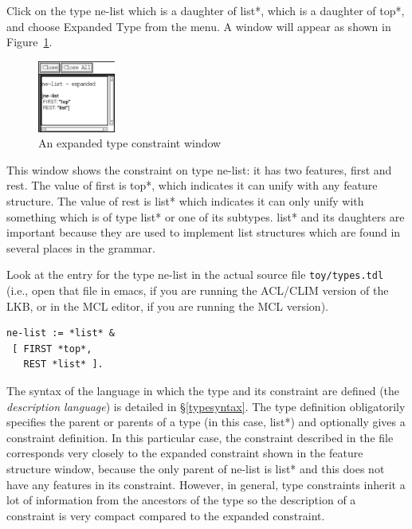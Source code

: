 \documentclass[12pt]{report}
\newcommand{\filename}[1]{{\tt #1}}
\newcommand{\lkbmenucommand}{{\bf}}
\newcommand{\newterm}[1]{{\it #1}}
\begin{document}
Click on the type {\type ne-list}
which is a daughter of {\type *list*}, which is a daughter of {\type *top*},
and choose {\lkbmenucommand Expanded Type} from the menu.  A window will appear
as shown in Figure~\ref{ne-list}.
\begin{figure}
\includegraphics[width=1in]{figs/ne-list}
\caption{An expanded type constraint window}
\label{ne-list}
\end{figure}
This window shows the constraint on type {\type ne-list}: it has
two features, {\feature first} and {\feature rest}.  The value of
{\feature first} is {\type *top*}, which indicates it can unify with any
feature structure.  The value of {\feature rest} is {\type *list*}
which indicates it can only unify with something which is
of type {\type *list*} or one of its subtypes.  {\type *list*} and 
its daughters are important because they are used to implement
list structures which are found in several places in the grammar.

Look at the entry for the type {\type ne-list} in the actual source
file \filename{toy/types.tdl} (i.e., open that file in emacs, if you are
running the ACL/CLIM version of the LKB, or in the MCL editor, if you are
running the MCL version).
\begin{verbatim}
ne-list := *list* &
 [ FIRST *top*,
   REST *list* ].
\end{verbatim}
The syntax of the language in which the type and its constraint
are defined (the
\newterm{description language}) is detailed in \S\ref{typesyntax}.
The type definition obligatorily
specifies the parent or parents of a type (in this case,
{\type *list*}) and optionally gives a constraint definition.
In this particular case, the constraint described in the file corresponds
very closely to the expanded constraint shown in the
feature structure window, because the only parent of {\type ne-list} is
{\type *list*} and this does not have any features in its constraint.
However, in general, type constraints inherit a lot of information from
the ancestors of the type so the description of a constraint is very compact
compared to the expanded constraint.
\end{document}
